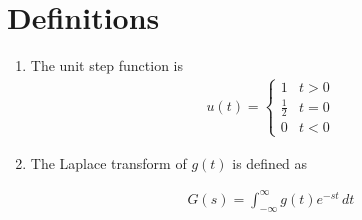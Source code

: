 \documentclass[journal,12pt,twocolumn]{IEEEtran}
\renewcommand\thesection{\arabic{section}}
\begin{document}
%
%
%

\section{Definitions}
\begin{enumerate}[label=\arabic*.,ref=\thesection.\theenumi]


\item The unit step function is 
\begin{align}
u(t) = 
    \begin{cases}
        1 & t > 0
        \\
        \frac{1}{2} & t = 0
        \\
        0 & t < 0
    \end{cases}
\end{align}

\item The Laplace transform of $g(t)$ is defined as 

\begin{align}
G(s) = \int_{-\infty}^{\infty} g(t) e^{-st}\, dt
\end{align}

\end{enumerate}
\end{document}
